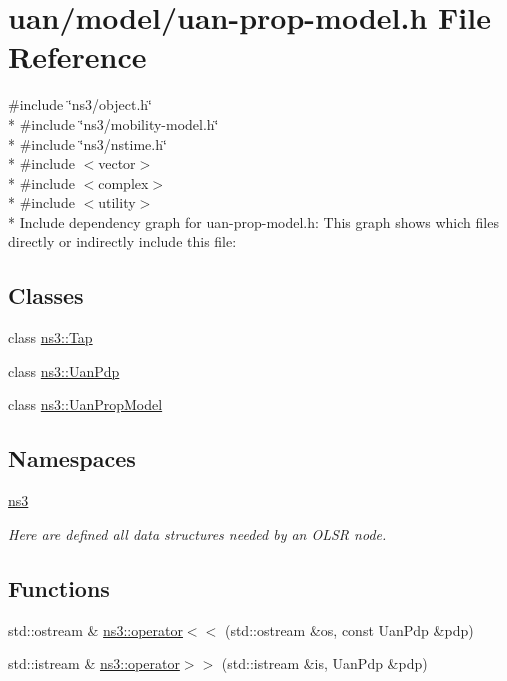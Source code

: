 \hypertarget{uan-prop-model_8h}{}\section{uan/model/uan-\/prop-\/model.h File Reference}
\label{uan-prop-model_8h}
{\ttfamily \#include \char`\"{}ns3/object.\+h\char`\"{}}\\*
{\ttfamily \#include \char`\"{}ns3/mobility-\/model.\+h\char`\"{}}\\*
{\ttfamily \#include \char`\"{}ns3/nstime.\+h\char`\"{}}\\*
{\ttfamily \#include $<$vector$>$}\\*
{\ttfamily \#include $<$complex$>$}\\*
{\ttfamily \#include $<$utility$>$}\\*
Include dependency graph for uan-\/prop-\/model.h\+:
This graph shows which files directly or indirectly include this file\+:
\subsection*{Classes}
\begin{DoxyCompactItemize}
\item 
class \hyperlink{classns3_1_1Tap}{ns3\+::\+Tap}
\item 
class \hyperlink{classns3_1_1UanPdp}{ns3\+::\+Uan\+Pdp}
\item 
class \hyperlink{classns3_1_1UanPropModel}{ns3\+::\+Uan\+Prop\+Model}
\end{DoxyCompactItemize}
\subsection*{Namespaces}
\begin{DoxyCompactItemize}
\item 
 \hyperlink{namespacens3}{ns3}
\begin{DoxyCompactList}\small\item\em Here are defined all data structures needed by an O\+L\+SR node. \end{DoxyCompactList}\end{DoxyCompactItemize}
\subsection*{Functions}
\begin{DoxyCompactItemize}
\item 
std\+::ostream \& \hyperlink{group__uan_ga8acd7fb8a2ad8fe421d493a79d94f83d}{ns3\+::operator$<$$<$} (std\+::ostream \&os, const Uan\+Pdp \&pdp)
\item 
std\+::istream \& \hyperlink{group__uan_ga50bd32eed5adab8e06873e2be6380525}{ns3\+::operator$>$$>$} (std\+::istream \&is, Uan\+Pdp \&pdp)
\end{DoxyCompactItemize}
